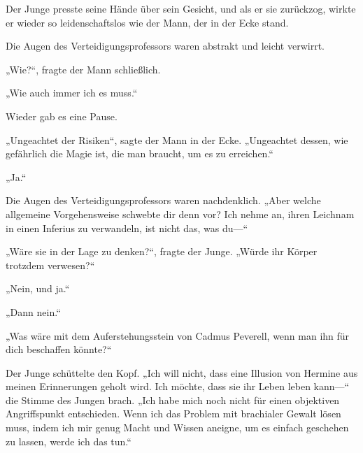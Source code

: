 Der Junge presste seine Hände über sein Gesicht, und als er sie zurückzog, wirkte er wieder so leidenschaftslos wie der Mann, der in der Ecke stand.

Die Augen des Verteidigungsprofessors waren abstrakt und leicht verwirrt.

„Wie?“, fragte der Mann schließlich.

„Wie auch immer ich es muss.“

Wieder gab es eine Pause.

„Ungeachtet der Risiken“, sagte der Mann in der Ecke. „Ungeachtet dessen, wie gefährlich die Magie ist, die man braucht, um es zu erreichen.“

„Ja.“

Die Augen des Verteidigungsprofessors waren nachdenklich.
„Aber welche allgemeine Vorgehensweise schwebte dir denn vor? Ich nehme an, ihren Leichnam in einen Inferius zu verwandeln, ist nicht das, was du—“

„Wäre sie in der Lage zu denken?“, fragte der Junge. „Würde ihr Körper trotzdem verwesen?“

„Nein, und ja.“

„Dann nein.“

„Was wäre mit dem Auferstehungsstein von Cadmus Peverell, wenn man ihn für dich beschaffen könnte?“

Der Junge schüttelte den Kopf.
„Ich will nicht, dass eine Illusion von Hermine aus meinen Erinnerungen geholt wird. Ich möchte, dass sie ihr Leben leben kann—“ die Stimme des Jungen brach. „Ich habe mich noch nicht für einen objektiven Angriffspunkt entschieden. Wenn ich das Problem mit brachialer Gewalt lösen muss, indem ich mir genug Macht und Wissen aneigne, um es einfach geschehen zu lassen, werde ich das tun.“

